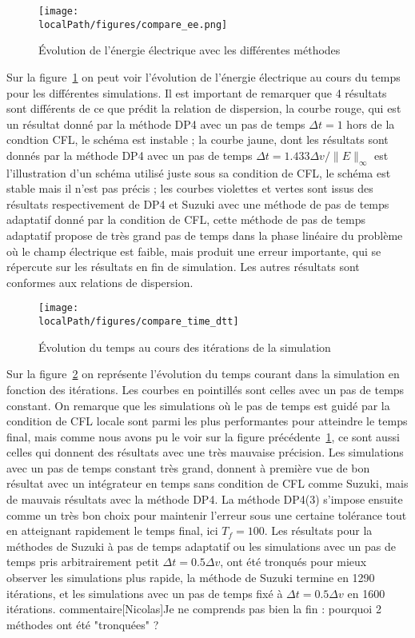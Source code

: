 \begin{figure}[h]
  \centering
  \texttt{[image: \\localPath/figures/compare\_ee.png]}
  \caption{Évolution de l'énergie électrique avec les différentes méthodes}
  \label{fig:compare:ee}
\end{figure}

Sur la figure~\ref{fig:compare:ee} on peut voir l'évolution de l'énergie électrique au cours du temps pour les différentes simulations. Il est important de remarquer que 4 résultats sont différents de ce que prédit la relation de dispersion, la courbe rouge, qui est un résultat donné par la méthode DP4 avec un pas de temps $\Delta t=1$ hors de la condtion CFL, le schéma est instable ; la courbe jaune, dont les résultats sont donnés par la méthode DP4 avec un pas de temps $\Delta t=1.433\Delta v/\|E\|_\infty$ est l'illustration d'un schéma utilisé juste sous sa condition de CFL, le schéma est stable mais il n'est pas précis ; les courbes violettes et vertes sont issus des résultats respectivement de DP4 et Suzuki avec une méthode de pas de temps adaptatif donné par la condition de CFL, cette méthode de pas de temps adaptatif propose de très grand pas de temps dans la phase linéaire du problème où le champ électrique est faible, mais produit une erreur importante, qui se répercute sur les résultats en fin de simulation. Les autres résultats sont conformes aux relations de dispersion. 

\begin{figure}[h]
  \centering
  \texttt{[image: \\localPath/figures/compare\_time\_dtt]}
  \caption{Évolution du temps au cours des itérations de la simulation}
  \label{fig:compare:time:dtt}
\end{figure}

Sur la figure~\ref{fig:compare:time:dtt} on représente l'évolution du temps courant dans la simulation en fonction des itérations. Les courbes en pointillés sont celles avec un pas de temps constant. On remarque que les simulations où le pas de temps est guidé par la condition de CFL locale sont parmi les plus performantes pour atteindre le temps final, mais comme nous avons pu le voir sur la figure précédente~\ref{fig:compare:ee}, ce sont aussi celles qui donnent des résultats avec une très mauvaise précision. Les simulations avec un pas de temps constant très grand, donnent à première vue de bon résultat avec un intégrateur en temps sans condition de CFL comme Suzuki, mais de mauvais résultats avec la méthode DP4. La méthode DP4(3) s'impose ensuite comme un très bon choix pour maintenir l'erreur sous une certaine tolérance tout en atteignant rapidement le temps final, ici $T_f=100$. Les résultats pour la méthodes de Suzuki à pas de temps adaptatif ou les simulations avec un pas de temps pris arbitrairement petit $\Delta t = 0.5\Delta v$, ont été tronqués pour mieux observer les simulations plus rapide, la méthode de Suzuki termine en 1290 itérations, et les simulations avec un pas de temps fixé à $\Delta t = 0.5\Delta v$ en 1600 itérations.
commentaire[Nicolas]{Je ne comprends pas bien la fin : pourquoi 2 m\'ethodes ont \'et\'e "tronqu\'ees" ? }

